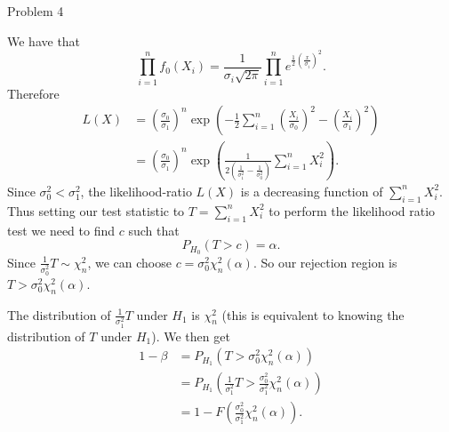 \documentclass{article}
\begin{document}
\begin{question}{Problem 4}
    \begin{part}
        We have that 
        \[\prod_{i=1}^nf_0(X_i) = \frac{1}{\sigma_i\sqrt{2\pi}}\prod_{i=1}^ne^{\frac{1}{2}\left(\frac{x}{\sigma_i}\right)^2}. \]
        Therefore
        \begin{align*}
            L(X) &= \left(\frac{\sigma_0}{\sigma_1}\right)^n\exp\left(-\frac{1}{2}\sum_{i=1}^n\left(\frac{X_i}{\sigma_0}\right)^2-\left(\frac{X_i}{\sigma_1}\right)^2\right)\\
                 &= \left(\frac{\sigma_0}{\sigma_1}\right)^n\exp\left(\frac{1}{2\left(\frac{1}{\sigma_1^2}-\frac{1}{\sigma_0^2}\right)}\sum_{i=1}^nX_i^2\right). 
        \end{align*}
        Since $\sigma^2_0<\sigma^2_1$, the likelihood-ratio $L(X)$ is a decreasing function of $\sum_{i=1}^nX_i^2$. Thus setting our test statistic to $T=\sum_{i=1}^nX_i^2$ to perform the likelihood ratio test we need to find $c$ such that 
        \[P_{H_0}(T > c) = \alpha. \]
        Since $\frac{1}{\sigma_0^2}T \sim \chi_n^2$, we can choose $c=\sigma_0^2\chi_n^2(\alpha)$. So our rejection region is $T>\sigma_0^2\chi_n^2(\alpha)$. 
    \end{part}
    \begin{part}
        The distribution of $\frac{1}{\sigma_1^2}T$ under $H_1$ is $\chi_n^2$ (this is equivalent to knowing the distribution of $T$ under $H_1$). We then get 
        \begin{align*}
            1-\beta&= P_{H_1}(T>\sigma_0^2\chi_n^2(\alpha))\\
                   &= P_{H_1}\left(\frac{1}{\sigma_1^2}T>\frac{\sigma_0^2}{\sigma_1^2}\chi_n^2(\alpha)\right)\\
                   &= 1-F\left(\frac{\sigma_0^2}{\sigma_1^2}\chi_n^2(\alpha)\right). 
        \end{align*}
    \end{part}
\end{question}
\end{document}
